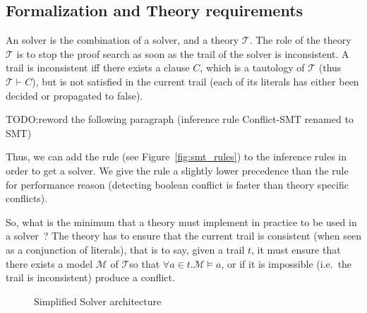 \documentclass{article}
\begin{document}
\subsection{Formalization and Theory requirements}

An \smt{} solver is the combination of a \sat{} solver, and a theory $\mathcal{T}$.
The role of the theory $\mathcal{T}$ is to stop the proof search as soon as the trail
of the \sat{} solver is inconsistent. A trail is inconsistent iff there exists a clause
$C$, which is a tautology of $\mathcal{T}$ (thus $\mathcal{T} \vdash C$), but is not
satisfied in the current trail (each of its literals has either been decided or
propagated to false).

TODO:reword the following paragraph (inference rule Conflict-SMT renamed to SMT)

Thus, we can add the  rule (see
Figure~\ref{fig:smt_rules}) to the \cdcl{} inference rules in order to get a \smt{} solver.
We give the  rule a slightly lower precedence than the
 rule for performance reason (detecting boolean conflict is
faster than theory specific conflicts).

So, what is the minimum that a theory must implement in practice to be used in a
\smt{} solver~? The theory has to ensure that the current trail is consistent
(when seen as a conjunction of literals), that is to say, given a trail $t$,
it must ensure that there exists a model $\mathcal{M}$ of $\mathcal{T} $so that
$\forall a \in t. \mathcal{M} \vDash a$, or if it is impossible (i.e.~the trail
is inconsistent) produce a conflict.

\begin{figure}
  \begin{center}
  \end{center}
  \caption{Simplified \smt{} Solver architecture}\label{fig:smt_flow}
\end{figure}
\end{document}

